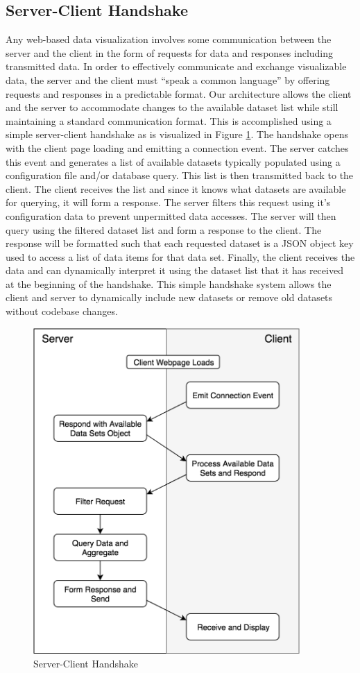 %
%

\subsection{Server-Client Handshake}
Any web-based data visualization involves some communication between the server and the client in the form of requests for data and responses including transmitted data.  In order to effectively communicate and exchange visualizable data, the server and the client must “speak a common language” by offering requests and responses in a predictable format.  Our architecture allows the client and the server to accommodate changes to the available dataset list while still maintaining a standard communication format.  This is accomplished using a simple server-client handshake as is visualized in Figure \ref{fig:server-client-handshake}.  The handshake opens with the client page loading and emitting a connection event.  The server catches this event and generates a list of available datasets typically populated using a configuration file and/or database query.  This list is then transmitted back to the client.  The client receives the list and since it knows what datasets are available for querying, it will form a response.  The server filters this request using it’s configuration data to prevent unpermitted data accesses.  The server will then query using the filtered dataset list and form a response to the client.  The response will be formatted such that each requested dataset is a JSON object key used to access a list of data items for that data set.  Finally, the client receives the data and can dynamically interpret it using the dataset list that it has received at the beginning of the handshake. This simple handshake system allows the client and server to dynamically include new datasets or remove old datasets without codebase changes. \par
\begin{figure}
    \centering
    \includegraphics[width=4in]{images/ServerClientHandshake.png}
    \caption{Server-Client Handshake}
    \label{fig:server-client-handshake}
 \end{figure}
